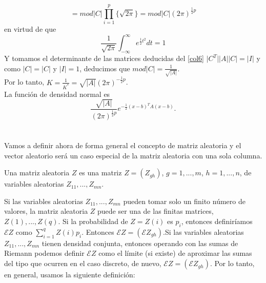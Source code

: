 \[ = mod \vert C \vert \prod_{i=1}^p \lbrace \sqrt{2 \pi} \rbrace= mod \vert C \vert (2 \pi)^{\frac{1}{2}p} \]
en virtud de que
\[ \frac{1}{\sqrt{2\pi}} \int_{-\infty}^{\infty} e^{\frac{1}{2}t^2}dt=1 \]
Y tomamos el determinante de las matrices deducidas del \autoref{col6} $\vert C^T \vert \vert A \vert \vert C \vert = \vert I \vert$ y como $\vert C \vert= \vert C \vert $ y $\vert I \vert=1$, deducimos que $mod \vert C \vert = \frac{1}{\sqrt{\vert A \vert}}$.\\
Por lo tanto, $K=\frac{1}{K^*}=\sqrt{\vert A \vert} (2\pi)^{-\frac{1}{2}p}$.\\
La función de densidad normal es
\[ \frac{\sqrt{\vert A \vert}}{(2 \pi)^{\frac{1}{2}p}} e^{-\frac{1}{2} (x-b)^T A (x-b)}. \]
\cite{anderson1958introduction}\\\\
Vamos a definir ahora de forma general el concepto de matriz aleatoria y el vector aleatorio será un caso especial de la matriz aleatoria con una sola columna.
\begin{definicion}
Una matriz aleatoria $Z$ es una matriz $Z=(Z_{gh})$, $g=1,...,m$, $h=1,...,n$, de variables aleatorias $Z_{11},...,Z_{mn}$.
\end{definicion}
Si las variables aleatorias $Z_{11},...,Z_{mn}$ pueden tomar solo un finito número de valores, la matriz aleatoria $Z$ puede ser una de las finitas matrices, $Z(1),...,Z(q)$. Si la probabilidad de $Z=Z(i)$ es $p_i$, entonces definiríamos $\mathcal{E}Z$ como $\sum_{i=1}^q Z(i)p_i$. Entonces $\mathcal{E}Z=(\mathcal{E}Z_{gh})$.Si las variables aleatorias $Z_{11},...,Z_{mn}$ tienen densidad conjunta, entonces operando con las sumas de Riemann podemos definir $\mathcal{E}Z$ como el límite (si existe) de aproximar las sumas del tipo que ocurren en el caso discreto, de nuevo, $\mathcal{E}Z=(\mathcal{E}Z_{gh})$. Por lo tanto, en general, usamos la siguiente definición:

